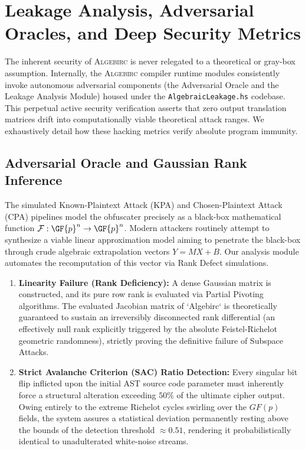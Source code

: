 \section{Leakage Analysis, Adversarial Oracles, and Deep Security Metrics}
\label{sec:analysis}

The inherent security of \textsc{Algebirc} is never relegated to a theoretical or gray-box assumption. Internally, the \textsc{Algebirc} compiler runtime modules consistently invoke autonomous adversarial components (the Adversarial Oracle and the Leakage Analysis Module) housed under the \texttt{AlgebraicLeakage.hs} codebase. This perpetual active security verification asserts that zero output translation matrices drift into computationally viable theoretical attack ranges. We exhaustively detail how these hacking metrics verify absolute program immunity.

\subsection{Adversarial Oracle and Gaussian Rank Inference}
The simulated Known-Plaintext Attack (KPA) and Chosen-Plaintext Attack (CPA) pipelines model the obfuscater precisely as a black-box mathematical function $\mathcal{F}: \GF{p}^n \to \GF{p}^n$. Modern attackers routinely attempt to synthesize a viable linear approximation model aiming to penetrate the black-box through crude algebraic extrapolation vectors $Y = MX + B$. Our analysis module automates the recomputation of this vector via Rank Defect simulations.
\begin{enumerate}
    \item \textbf{Linearity Failure (Rank Deficiency):} A dense Gaussian matrix is constructed, and its pure row rank is evaluated via Partial Pivoting algorithms. The evaluated Jacobian matrix of `Algebirc` is theoretically guaranteed to sustain an irreversibly disconnected rank differential (an effectively null rank explicitly triggered by the absolute Feistel-Richelot geometric randomness), strictly proving the definitive failure of Subspace Attacks.
    \item \textbf{Strict Avalanche Criterion (SAC) Ratio Detection:} Every singular bit flip inflicted upon the initial AST source code parameter must inherently force a structural alteration exceeding $50\%$ of the ultimate cipher output. Owing entirely to the extreme Richelot cycles swirling over the $GF(p)$ fields, the system assures a statistical deviation permanently resting above the bounds of the detection threshold $\approx 0.51$, rendering it probabilistically identical to unadulterated white-noise streams.
\end{enumerate}

